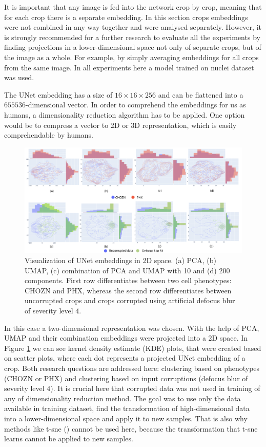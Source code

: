 It is important that any image is fed into the network crop by crop, meaning that for each crop there is a separate embedding. In this section crops embeddings were not combined in any way together and were analysed separately. However, it is strongly recommended for a further research to evaluate all the experiments by finding projections in a lower-dimensional space not only of separate crops, but of the image as a whole. For example, by simply averaging embeddings for all crops from the same image. In all experiments here a model trained on nuclei dataset was used.

The UNet embedding has a size of $16 \times 16 \times 256$ and can be flattened into a $655536$-dimensional vector. In order to comprehend the embeddings for us as humans, a dimensionality reduction algorithm has to be applied. One option would be to compress a vector to 2D or 3D representation, which is easily comprehendable by humans.
\begin{figure}[htb]
	\includegraphics[width=\linewidth]{bilder/unet-embeddings/umap-pca-embeddings.png}
	\caption[Visualization of UNet embeddings in 2D space]%
	{Visualization of UNet embeddings in 2D space. (a) PCA, (b) UMAP, (c) combination of PCA and UMAP with 10 and (d) 200 components. First row differentiates between two cell phenotypes: CHOZN and PHX, whereas the second row differentiates between uncorrupted crops and crops corrupted using artificial defocus blur of severity level $4$.}\label{fig:umap-pca-embeddings}
\end{figure}

In this case a two-dimensional representation was chosen. With the help of PCA, UMAP and their combination embeddings were projected into a 2D space. In Figure \ref{fig:umap-pca-embeddings} we can see kernel density estimate (KDE) plots, that were created based on scatter plots, where each dot represents a projected UNet embedding of a crop. Both research questions are addressed here: clustering based on phenotypes (CHOZN or PHX) and clustering based on input corruptions (defocus blur of severity level $4$). It is crucial here that corrupted data was not used in training of any of dimensionality reduction method. The goal was to use only the data available in training dataset, find the transformation of high-dimensional data into a lower-dimensional space and apply it to new samples. That is also why methods like t-sne (\cite{t-sne}) cannot be used here, because the transformation that t-sne learns cannot be applied to new samples. 

